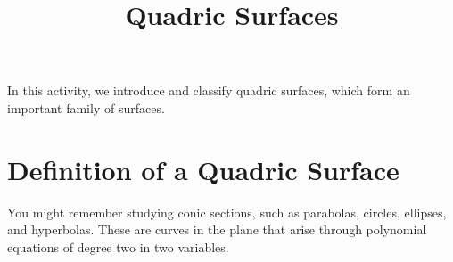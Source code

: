 \documentclass{ximera}
\title{Quadric Surfaces}
\begin{document}
\begin{abstract}
\end{abstract}
\maketitle


In this activity, we introduce and classify quadric surfaces, which form an important family of surfaces.

\section*{Definition of a Quadric Surface}

You might remember studying conic sections, such as parabolas, circles, ellipses, and hyperbolas. These are curves in the plane that arise through polynomial equations of degree two in two variables.

\begin{image}
\end{image}
\end{document}
